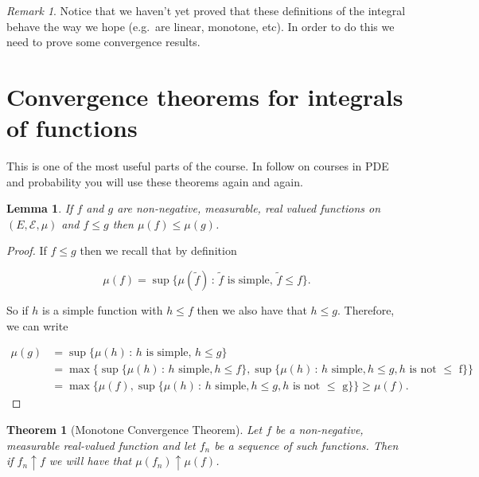 \documentclass[
]{book}
\newtheorem{theorem}{Theorem}[chapter]
\newtheorem{lemma}{Lemma}[chapter]
\theoremstyle{definition}
\theoremstyle{definition}
\theoremstyle{definition}
\theoremstyle{definition}
\theoremstyle{remark}
\newtheorem*{remark}{Remark}
\begin{document}
\begin{remark}
Notice that we haven't yet proved that these definitions of the integral behave the way we hope (e.g.~are linear, monotone, etc). In order to do this we need to prove some convergence results.
\end{remark}

\hypertarget{convergence-theorems-for-integrals-of-functions}{%
\section{Convergence theorems for integrals of functions}\label{convergence-theorems-for-integrals-of-functions}}

This is one of the most useful parts of the course. In follow on courses in PDE and probability you will use these theorems again and again.

\begin{lemma}
If \(f\) and \(g\) are non-negative, measurable, real valued functions on \((E, \mathcal{E}, \mu)\) and \(f \leq g\) then \(\mu(f) \leq \mu(g)\).
\end{lemma}

\begin{proof}
If \(f \leq g\) then we recall that by definition

\[\mu(f) = \sup\{ \mu(\tilde{f}) \,:\, \mbox{$\tilde{f}$ is simple},\, \tilde{f} \leq f\}.\]

So if \(h\) is a simple function with \(h \leq f\) then we also have that \(h \leq g\). Therefore, we can write

\begin{align*} \mu(g) &= \sup\{ \mu(h) \,:\, \mbox{$h$ is simple},\, h \leq g\} \\ &= \max\{\sup\{ \mu(h)\, :\, \mbox{$h$ simple}, h \leq f\}, \sup\{ \mu(h)\, :\, \mbox{$h$ simple}, h \leq g, \mbox{$h$ is not $\leq$ f}\} \}\\ &= \max\{ \mu(f), \sup\{ \mu(h)\, :\, \mbox{$h$ simple}, h \leq g, \mbox{$h$ is not $\leq$ g}\}\} \geq \mu(f).\end{align*}
\end{proof}

\begin{theorem}[Monotone Convergence Theorem]
Let \(f\) be a non-negative, measurable real-valued function and let \(f_n\) be a sequence of such functions. Then if \(f_n \uparrow f\) we will have that \(\mu(f_n) \uparrow \mu(f)\).
\end{theorem}
\end{document}
